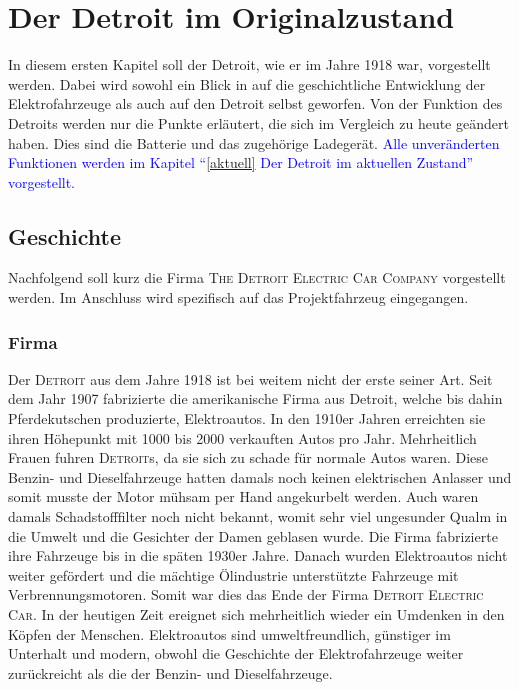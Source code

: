 \chapter{Der Detroit im Originalzustand}
In diesem ersten Kapitel soll der Detroit, wie er im Jahre 1918 war, vorgestellt werden. Dabei wird sowohl ein Blick in auf die geschichtliche Entwicklung der Elektrofahrzeuge als auch auf den Detroit selbst geworfen. Von der Funktion des Detroits werden nur die Punkte erläutert, die sich im Vergleich zu heute geändert haben. Dies sind die Batterie und das zugehörige Ladegerät. \textcolor{blue}{Alle unveränderten Funktionen werden im Kapitel "`\ref{aktuell} Der Detroit im aktuellen Zustand"' vorgestellt.}

\section{Geschichte}

Nachfolgend soll kurz die Firma \textsc{The Detroit Electric Car Company} vorgestellt werden. Im Anschluss wird spezifisch auf das Projektfahrzeug eingegangen.

\subsection{Firma}

Der \textsc{Detroit} aus dem Jahre 1918 ist bei weitem nicht der erste seiner Art. Seit dem Jahr 1907 fabrizierte die amerikanische Firma aus Detroit, welche bis dahin Pferdekutschen produzierte, Elektroautos. In den 1910er Jahren erreichten sie ihren Höhepunkt mit 1000 bis 2000 verkauften Autos pro Jahr. Mehrheitlich Frauen fuhren \textsc{Detroit}s, da sie sich zu schade für normale Autos waren. Diese Benzin- und Dieselfahrzeuge hatten damals noch keinen elektrischen Anlasser und somit musste der Motor mühsam per Hand angekurbelt werden. Auch waren damals Schadstofffilter noch nicht bekannt, womit sehr viel ungesunder Qualm in die Umwelt und die Gesichter der Damen geblasen wurde. Die Firma fabrizierte ihre Fahrzeuge bis in die späten 1930er Jahre. Danach wurden Elektroautos nicht weiter gefördert und die mächtige Ölindustrie unterstützte Fahrzeuge mit Verbrennungsmotoren. Somit war dies das Ende der Firma \textsc{Detroit Electric Car}.
In der heutigen Zeit ereignet sich mehrheitlich wieder ein Umdenken in den Köpfen der Menschen. Elektroautos sind umweltfreundlich, günstiger im Unterhalt und modern, obwohl die Geschichte der Elektrofahrzeuge weiter zurückreicht als die der Benzin- und Dieselfahrzeuge.

